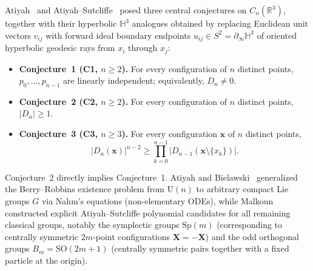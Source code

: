 \documentclass[11pt,reqno]{amsart}
\theoremstyle{remark}
\newcommand{\R}{\mathbb{R}}
\newcommand{\Hy}{\mathbb{H}}
\begin{document}
Atiyah~\cite{Atiyah2001} and Atiyah--Sutcliffe~\cite{AtiyahSutcliffe2002} posed three central conjectures on $C_n(\R^3)$, together with their hyperbolic $\Hy^3$ analogues obtained by replacing Euclidean unit vectors $v_{ij}$ with forward ideal boundary endpoints $u_{ij} \in S^2 = \partial_\infty \Hy^3$ of oriented hyperbolic geodesic rays from $x_i$ through $x_j$:
\begin{itemize}
  \item \textbf{Conjecture~1 (C1, $n \ge 2$).} For every configuration of $n$ distinct points, $p_0, \dots, p_{n-1}$ are linearly independent; equivalently, $D_n \ne 0$.
  \item \textbf{Conjecture~2 (C2, $n \ge 2$).} For every configuration of $n$ distinct points, $|D_n| \ge 1$.
  \item \textbf{Conjecture~3 (C3, $n \ge 3$).} For every configuration $\mathbf{x}$ of $n$ distinct points,
  \[
    |D_n(\mathbf{x})|^{n-2} \ge \prod_{k=0}^{n-1} |D_{n-1}(\mathbf{x} \setminus \{x_k\})|.
  \]
\end{itemize}
Conjecture~2 directly implies Conjecture~1.
Atiyah and Bielawski~\cite{AtiyahBielawski2002} generalized the Berry--Robbins existence problem from $\mathrm{U}(n)$ to arbitrary compact Lie groups $G$ via Nahm's equations (non-elementary ODEs), while Malkoun~\cite{Malkoun2014,Malkoun2015} constructed explicit Atiyah--Sutcliffe polynomial candidates for all remaining classical groups, notably the symplectic groups $\mathrm{Sp}(m)$ (corresponding to centrally symmetric $2m$-point configurations $\mathbf{X} = -\mathbf{X}$) and the odd orthogonal groups $B_m = \mathrm{SO}(2m+1)$ (centrally symmetric pairs together with a fixed particle at the origin).
\end{document}
